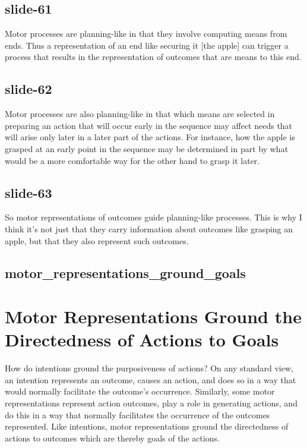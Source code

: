 \documentclass[12pt,\papersize]{extarticle}
\begin{document}
\subsection{slide-61}
Motor processes are planning-like in that they involve computing means from ends.
Thus a representation of an end like securing it [the apple] can trigger a process
that results in the representation of outcomes that are means to this end.
 
\subsection{slide-62}
Motor processes are also planning-like in that which means are selected in preparing an
action that will occur early in the sequence may affect needs that will arise only later
in a later part of the actions.
For instance, how the apple is grasped at an early point in the sequence may be determined
in part by what would be a more comfortable way for the other hand to grasp it later.
 
\subsection{slide-63}
So motor representations of outcomes guide planning-like processes.
This is why I think it’s not just that they carry information about outcomes
like grasping an apple, but that they also represent such outcomes.
 
\subsection{motor\_representations\_ground\_goals}
 
 
\section{Motor Representations Ground the Directedness of Actions to Goals}
 
How do intentions ground the purposiveness of actions? On any standard view, an intention
represents an outcome, causes an action, and does so in a way that would normally facilitate
the outcome’s occurrence. Similarly, some motor representations represent action
outcomes, play a role in generating actions, and do this in a way that normally facilitates
the occurrence of the outcomes represented. Like intentions, motor representations
ground the directedness of actions to outcomes which are thereby goals of the actions.
 
\end{document}
